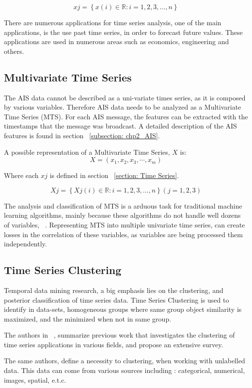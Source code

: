 \[xj = \left \{ x(i) \in \mathbb{R}: i = 1,2,3,...,n \right \} \]

 There are numerous applications for time series analysis, one of the main applications, is the use past time series, in order to forecast future values. These applications are used in numerous areas such as economics, engineering and others.


\subsection{Multivariate Time Series}
The AIS data cannot be described as a uni-variate times series, as it is composed by various variables. Therefore AIS data needs to be analyzed as a Multivariate Time Series (MTS).
For each AIS message, the features can be extracted with the timestamps that the message was broadcast. A detailed description of the AIS features is found in section ~\ref{subsection: chp2_AIS}. 

A possible representation of a Multivariate Time Series, $X$ is:
\[ X = (x_{1}, x_{2}, x_{3}, \cdots,x_{m}) \]

Where each $xj$ is defined in section ~\ref{section: Time Series}.

\[ Xj = \left \{ Xj(i) \in \mathbb{R}: i = 1,2,3,...,n \right \} (j = 1,2,3) \]

The analysis and classification of MTS is a arduous task for traditional machine learning algorithms, mainly because these algorithms do not handle well dozens of variables, ~\cite{MTS1}. Representing MTS into multiple univariate time series, can create losses in the correlation of these variables, as variables are being processed them independently.

\subsection{Time Series Clustering}
Temporal data mining research, a big emphasis lies on the clustering, and posterior classification of time series data. Time Series Clustering is used to identify in data-sets, homogeneous groups where same group object similarity is maximized, and the minimized when not in same group.  

The authors in ~\cite{WarrenLiao2005}, summarize previous work that investigates the clustering of time series applications in various fields, and propose an extensive survey. 

The same authors, define a necessity to clustering, when working with unlabelled data. This data can come from various sources including : categorical, numerical, images, spatial, e.t.c.

